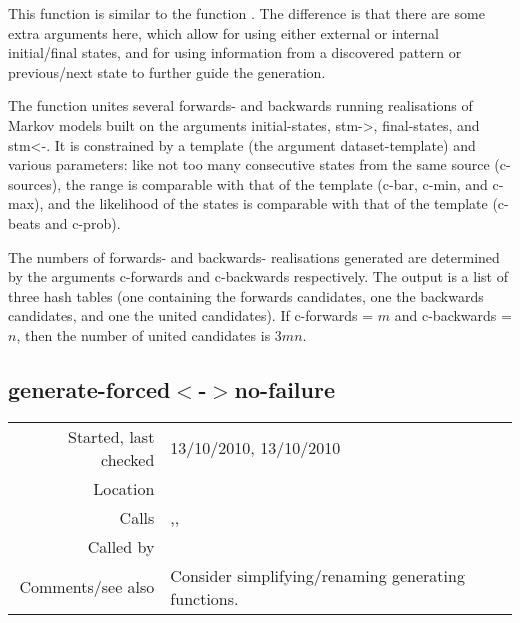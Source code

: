 \noindent This function is similar to the function
. The difference is that
there are some extra arguments here, which allow for
using either external or internal initial/final
states, and for using information from a discovered
pattern or previous/next state to further guide the
generation.

The function unites several forwards- and backwards
running realisations of Markov models built on the
arguments initial-states, stm->, final-states, and
stm<-. It is constrained by a template (the argument
dataset-template) and various parameters: like not too
many consecutive states from the same source
(c-sources), the range is comparable with that of the
template (c-bar, c-min, and c-max), and the likelihood
of the states is comparable with that of the template
(c-beats and c-prob).

The numbers of forwards- and backwards- realisations
generated are determined by the arguments c-forwards
and c-backwards respectively. The output is a list of
three hash tables (one containing the forwards
candidates, one the backwards candidates, and one the
united candidates). If c-forwards = $m$ and
c-backwards = $n$, then the number of united
candidates is $3mn$.


\subsection*{generate-forced$<$-$>$no-failure}\label{fun:generate-forced<->no-failure}

\vspace{0.3cm}
\begin{tabular}{r|p{8cm}}
Started, last checked & 13/10/2010, 13/10/2010 \\
Location & \nameref{sec:generating-beat-MNN-spacing-for-and-back} \\
Calls & \nameref{fun:generate-beat-spacing-forcing->},\newline \nameref{fun:generate-beat-spacing-forcing<-},\newline \nameref{fun:segments-strict} \\
Called by & \nameref{fun:generate-beat-spacing-forced<->} \\
Comments/see also & Consider simplifying/renaming generating functions.
\end{tabular}

